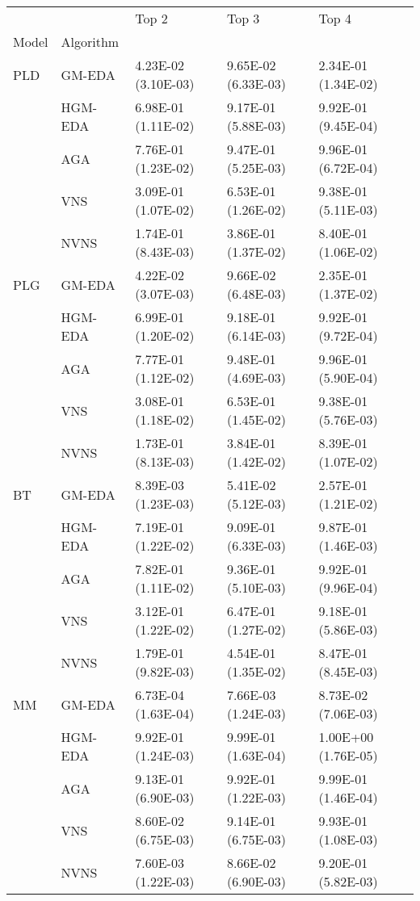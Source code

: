 \begin{tabular}{lllll}
\toprule
   &      &                Top 2 &                Top 3 &                Top 4 \\
Model & Algorithm &                      &                      &                      \\
\midrule
PLD & GM-EDA &  4.23E-02 (3.10E-03) &  9.65E-02 (6.33E-03) &  2.34E-01 (1.34E-02) \\
   & HGM-EDA &  6.98E-01 (1.11E-02) &  9.17E-01 (5.88E-03) &  9.92E-01 (9.45E-04) \\
   & AGA &  7.76E-01 (1.23E-02) &  9.47E-01 (5.25E-03) &  9.96E-01 (6.72E-04) \\
   & VNS &  3.09E-01 (1.07E-02) &  6.53E-01 (1.26E-02) &  9.38E-01 (5.11E-03) \\
   & NVNS &  1.74E-01 (8.43E-03) &  3.86E-01 (1.37E-02) &  8.40E-01 (1.06E-02) \\
PLG & GM-EDA &  4.22E-02 (3.07E-03) &  9.66E-02 (6.48E-03) &  2.35E-01 (1.37E-02) \\
   & HGM-EDA &  6.99E-01 (1.20E-02) &  9.18E-01 (6.14E-03) &  9.92E-01 (9.72E-04) \\
   & AGA &  7.77E-01 (1.12E-02) &  9.48E-01 (4.69E-03) &  9.96E-01 (5.90E-04) \\
   & VNS &  3.08E-01 (1.18E-02) &  6.53E-01 (1.45E-02) &  9.38E-01 (5.76E-03) \\
   & NVNS &  1.73E-01 (8.13E-03) &  3.84E-01 (1.42E-02) &  8.39E-01 (1.07E-02) \\
BT & GM-EDA &  8.39E-03 (1.23E-03) &  5.41E-02 (5.12E-03) &  2.57E-01 (1.21E-02) \\
   & HGM-EDA &  7.19E-01 (1.22E-02) &  9.09E-01 (6.33E-03) &  9.87E-01 (1.46E-03) \\
   & AGA &  7.82E-01 (1.11E-02) &  9.36E-01 (5.10E-03) &  9.92E-01 (9.96E-04) \\
   & VNS &  3.12E-01 (1.22E-02) &  6.47E-01 (1.27E-02) &  9.18E-01 (5.86E-03) \\
   & NVNS &  1.79E-01 (9.82E-03) &  4.54E-01 (1.35E-02) &  8.47E-01 (8.45E-03) \\
MM & GM-EDA &  6.73E-04 (1.63E-04) &  7.66E-03 (1.24E-03) &  8.73E-02 (7.06E-03) \\
   & HGM-EDA &  9.92E-01 (1.24E-03) &  9.99E-01 (1.63E-04) &  1.00E+00 (1.76E-05) \\
   & AGA &  9.13E-01 (6.90E-03) &  9.92E-01 (1.22E-03) &  9.99E-01 (1.46E-04) \\
   & VNS &  8.60E-02 (6.75E-03) &  9.14E-01 (6.75E-03) &  9.93E-01 (1.08E-03) \\
   & NVNS &  7.60E-03 (1.22E-03) &  8.66E-02 (6.90E-03) &  9.20E-01 (5.82E-03) \\
\bottomrule
\end{tabular}

